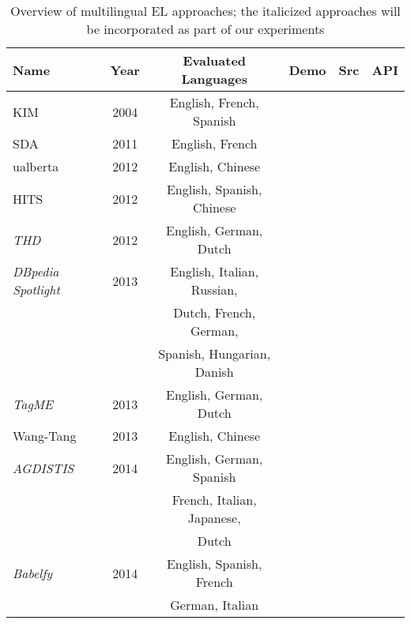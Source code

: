 \documentclass{llncs}
\newcommand{\cmark}{\ding{51}}%
\newcommand{\xmark}{\ding{55}}%
\begin{document}
\begin{table}[t]
	\centering
	\caption{Overview of multilingual EL approaches; the italicized approaches will be incorporated as part of our experiments}
	\label{tab:multilingual_approaches}
	\setlength{\tabcolsep}{3pt}
	\begin{tabular}{lccccr}
		\toprule
		\textbf{Name} &  \textbf{Year} & \textbf{Evaluated Languages} & \textbf{Demo} & \textbf{Src} & \textbf{API}\\ \midrule
		
		KIM \cite{KIM-popov2004kim} & 2004 &English, French, Spanish&\cmark&\xmark&\cmark\\\midrule
		
		SDA \cite{SDA-charton2011automatic}  & 2011 &English, French&\xmark&\xmark&\xmark\\\midrule
		
		ualberta \cite{guo2012ualberta}& 2012 &English, Chinese&\xmark&\xmark&\xmark\\\midrule
		
		HITS \cite{fahrni2012hits} & 2012 & English, Spanish, Chinese&\xmark&\xmark&\xmark\\\midrule
		
		\textit{THD} \cite{THD-dojchinovski2012recognizing}  & 2012 &English, German, Dutch&\cmark&\cmark&\cmark\\\midrule 
		
		\textit{DBpedia Spotlight} \cite{mendes2011dbpedia,daiber2013improving} & 2013  &English, Italian, Russian,&\cmark&\cmark&\cmark\\
		& &Dutch, French, German,&&&\\
		& &Spanish, Hungarian, Danish&&&\\\midrule
		
		\textit{TagME} \cite{ferragina2010tagme} & 2013 & English, German, Dutch &\cmark&\xmark&\cmark\\\midrule
		
		Wang-Tang \cite{wang2013boosting} & 2013 & English, Chinese&\xmark&\xmark&\xmark\\\midrule
		
		\textit{AGDISTIS} \cite{usbeck2014agdistis,mag2017}& 2014 & English, German, Spanish&\cmark&\cmark&\cmark\\
		& &French, Italian, Japanese,&&&\\
		& &Dutch&&&\\\midrule
		
		\textit{Babelfy} \cite{Babelfy-moro2014entity}& 2014 &English, Spanish, French &\cmark&\xmark&\cmark\\
		& &German, Italian&&&\\\midrule
		

\end{tabular}
\end{table}
\end{document}
